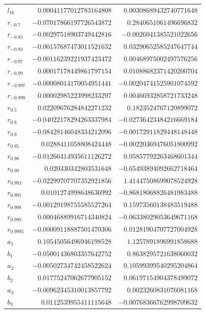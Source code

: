 \documentclass[11pt]{article}
\theoremstyle{definition}
\begin{document}
{\begin{longtable}{lrr}
$l_{16}$ & $0.00041177012783164808$ & $0.00308689432740771648$\\
$r_{-0.7}$ & $-0.07017866197726543872$ & $0.2840651061496696832$\\
$r_{-0.85}$ & $-0.00297518903749442816$ & $-0.0026041385521022656$\\
$r_{-0.93}$ & $-0.00157687473011521632$ & $0.03290652585247647744$\\
$r_{-0.97}$ & $-0.00116239221937423472$ & $0.00468975002497576256$\\
$r_{-0.99}$ & $0.00017178449861797154$ & $0.01088682371420200704$\\
$r_{-0.997}$ & $-0.00008014170054951441$ & $-0.00204741525901074592$\\
$r_{-0.999}$ & $0.00002985223998233297$ & $0.00466932858721733248$\\
$r_{0.5}$ & $0.02209676284842271232$ & $0.1823524767120899072$\\
$r_{0.8}$ & $-0.04022178294263337984$ & $-0.02736423484216669184$\\
$r_{0.9}$ & $-0.08428146048334212096$ & $-0.00172911829448148448$\\
$r_{0.95}$ & $0.0288411058808424448$ & $-0.00220369476051800992$\\
$r_{0.98}$ & $-0.01266414935611126272$ & $0.05857792263468601344$\\
$r_{0.99}$ & $0.020330342803531648$ & $-0.65493894092662718464$\\
$r_{0.993}$ & $-0.02299707707352921856$ & $1.41447508699078524928$\\
$r_{0.995}$ & $0.0101274998648636992$ & $-0.86818068826481983488$\\
$r_{0.998}$ & $-0.00129198755585527264$ & $0.15973560138483519488$\\
$r_{0.999}$ & $0.00046889916714340824$ & $-0.06338029053649671168$\\
$r_{0.9995}$ & $-0.00009118887501470306$ & $0.01281904707727004928$\\
$a_{1}$ & $0.10545056496946198528$ & $1.1257891896991858688$\\
$b_{1}$ & $-0.05001436803357642752$ & $0.8638295721638060032$\\
$a_{2}$ & $-0.00502734742458522624$ & $0.10599399540295204864$\\
$b_{2}$ & $0.01775247062677905152$ & $0.06197154904378499072$\\
$a_{3}$ & $-0.00962345310013857792$ & $0.0023260831076081168$\\
$b_{3}$ & $0.0112539955411115648$ & $-0.00768366762998709632$\\

\end{longtable}}
\end{document}

